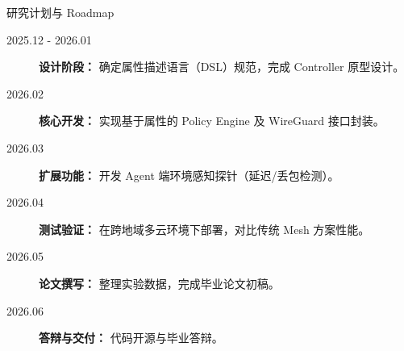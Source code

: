 \documentclass[aspectratio=169, 10pt]{beamer}
\begin{document}
\begin{frame}{研究计划与 Roadmap}
    \begin{description}
        \item[2025.12 - 2026.01] \textbf{设计阶段：} 确定属性描述语言（DSL）规范，完成 Controller 原型设计。
        \item[2026.02] \textbf{核心开发：} 实现基于属性的 Policy Engine 及 WireGuard 接口封装。
        \item[2026.03] \textbf{扩展功能：} 开发 Agent 端环境感知探针（延迟/丢包检测）。
        \item[2026.04] \textbf{测试验证：} 在跨地域多云环境下部署，对比传统 Mesh 方案性能。
        \item[2026.05] \textbf{论文撰写：} 整理实验数据，完成毕业论文初稿。
        \item[2026.06] \textbf{答辩与交付：} 代码开源与毕业答辩。
    \end{description}
\end{frame}
\end{document}
